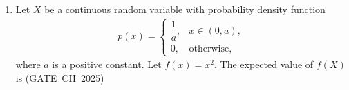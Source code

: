 \begin{enumerate}[label=\thesubsection.\arabic*, ref=\thesubsection.\theenumi,itemsep=0pt]
\solution For a vector field, the Jacobian matrix is given by \eqref{eq:jacobian}, and the divergence is related to its trace by \eqref{eq:divergence_trace}.

For
\begin{align}
\vec{v}=v_x\hat{i}+v_y\hat{j},
\end{align}
the Jacobian is
\begin{align}
J_{\vec{v}}=
\myvec{
\dfrac{\partial v_x}{\partial x} & \dfrac{\partial v_x}{\partial y}\\
\dfrac{\partial v_y}{\partial x} & \dfrac{\partial v_y}{\partial y}
}.
\end{align}
The divergence is the trace:
\begin{align}
\nabla\cdot\vec{v}
&=\operatorname{tr}(J_{\vec{v}})\\
&=\frac{\partial v_x}{\partial x}+\frac{\partial v_y}{\partial y}.
\end{align}
Here,
\begin{align}
v_x=ax,\qquad v_y=-by.
\end{align}
Therefore,
\begin{align}
\frac{\partial v_x}{\partial x}=a,
\qquad
\frac{\partial v_y}{\partial y}=-b.
\end{align}
Thus,
\begin{align}
\nabla\cdot\vec{v}=a-b.
\end{align}
For zero divergence,
\begin{align}
a-b=0.
\end{align}

The code to verify this is:
\begin{lstlisting}[frame=single, basicstyle=\rmfamily, escapeinside={(*@}{@*)}]
(*@\makebox[\dimexpr\linewidth-2\fboxsep-2\fboxrule\relax][c]{codes/q36/main.py}@*)
\end{lstlisting}

\item Let $X$ be a continuous random variable with probability density function
\begin{align}
p(x)=\begin{cases}
\dfrac{1}{a}, & x\in(0,a),\\
0, & \text{otherwise},
\end{cases}
\end{align}
where $a$ is a positive constant. Let $f(x)=x^2$. The expected value of $f(X)$ is \hfill (GATE~CH~2025)
\begin{enumerate}[itemsep=0pt]
\end{enumerate}


\end{enumerate}
